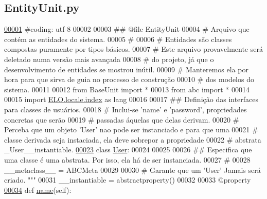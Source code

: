 \hypertarget{EntityUnit_8py_source}{}\subsection{Entity\+Unit.\+py}
\label{EntityUnit_8py_source}

\begin{DoxyCode}
\hypertarget{EntityUnit_8py_source_l00001}{}\hyperlink{namespaceELO_1_1EntityUnit}{00001} \textcolor{comment}{#coding: utf-8}
00002 
00003 \textcolor{comment}{## @file EntityUnit}
00004 \textcolor{comment}{#   Arquivo que contém as entidades do sistema.}
00005 \textcolor{comment}{#}
00006 \textcolor{comment}{#   Entidades são classes compostas puramente por tipos básicos.}
00007 \textcolor{comment}{#   Este arquivo provavelmente será deletado numa versão mais avançada}
00008 \textcolor{comment}{#   do projeto, já que o desenvolvimento de entidades se mostrou inútil.}
00009 \textcolor{comment}{#   Manteremos ela por hora para que sirva de guia no processo de construção}
00010 \textcolor{comment}{#   dos modelos do sistema.}
00011 
00012 \textcolor{keyword}{from} BaseUnit \textcolor{keyword}{import} *
00013 \textcolor{keyword}{from} abc \textcolor{keyword}{import} *
00014 
00015 \textcolor{keyword}{import} \hyperlink{namespaceELO_1_1locale_1_1index}{ELO.locale.index} \textcolor{keyword}{as} lang
00016 
00017 \textcolor{comment}{## Definição das interfaces para classes de usuários.}
00018 \textcolor{comment}{#   Inclui-se 'name' e 'password', propriedades concretas que serão}
00019 \textcolor{comment}{#   passadas áquelas que delas derivam.}
00020 \textcolor{comment}{#   Perceba  que um objeto 'User' nao pode ser instanciado e para que uma }
00021 \textcolor{comment}{#   classe derivada seja instaciada, ela deve sobrepor a propriedade}
00022 \textcolor{comment}{#   abstrata \_User\_\_instantiable.   }
\hypertarget{EntityUnit_8py_source_l00023}{}\hyperlink{classELO_1_1EntityUnit_1_1User}{00023} \textcolor{keyword}{class }\hyperlink{classELO_1_1EntityUnit_1_1User}{User}:
00024     
00025     
00026     \textcolor{comment}{## Especifica que uma classe é uma abstrata. Por isso, ela há de ser instanciada.}
00027     \textcolor{comment}{#}
00028     \_\_metaclass\_\_ = ABCMeta
00029 
00030     \textcolor{comment}{# Garante que um 'User' Jamais será criado. """}
00031     \_\_instantiable = abstractproperty()
00032 
00033     @property
\hypertarget{EntityUnit_8py_source_l00034}{}\hyperlink{classELO_1_1EntityUnit_1_1User_af1043e061530216672b7b05c60ac8aad}{00034}     \textcolor{keyword}{def }\hyperlink{classELO_1_1EntityUnit_1_1User_af1043e061530216672b7b05c60ac8aad}{name}(self):

\end{DoxyCode}
